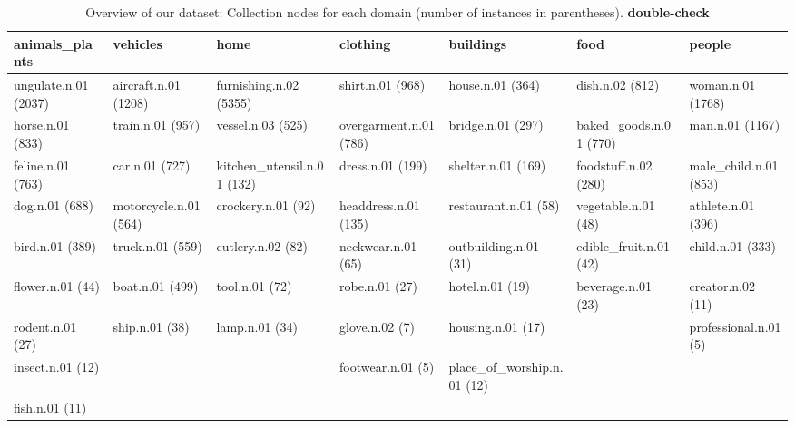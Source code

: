 \begin{table*}
\small
	\begin{tabular}{@{~}l@{~}l@{~}l@{~}l@{~}l@{~}l@{~}l}
	\toprule
	        animals\_plants &               vehicles &                        home &                clothing &                   buildings &                    food &                 people \\
	\midrule
	  ungulate.n.01 (2037) &  aircraft.n.01 (1208) &  furnishing.n.02 (5355) &  shirt.n.01 (968) &  house.n.01 (364) &  dish.n.02 (812) &  woman.n.01 (1768) \\
	 horse.n.01 (833) &  train.n.01 (957) &  vessel.n.03 (525) &  overgarment.n.01 (786) &  bridge.n.01 (297) &  baked\_goods.n.01 (770) &  man.n.01 (1167) \\
	  feline.n.01 (763) &  car.n.01 (727) &  kitchen\_utensil.n.01 (132) &  dress.n.01 (199) &  shelter.n.01 (169) &  foodstuff.n.02 (280) &  male\_child.n.01 (853) \\
	 dog.n.01 (688) &  motorcycle.n.01 (564) &  crockery.n.01 (92) &  headdress.n.01 (135) &  restaurant.n.01 (58) &  vegetable.n.01 (48) &  athlete.n.01 (396) \\
	  bird.n.01 (389) &  truck.n.01 (559) &  cutlery.n.02 (82) &  neckwear.n.01 (65) &  outbuilding.n.01 (31) &  edible\_fruit.n.01 (42) &  child.n.01 (333) \\
	  flower.n.01 (44) &  boat.n.01 (499) &  tool.n.01 (72) &  robe.n.01 (27) &  hotel.n.01 (19) &  beverage.n.01 (23) &  creator.n.02 (11) \\
	  rodent.n.01 (27) &  ship.n.01 (38) &  lamp.n.01 (34) &  glove.n.02 (7) &  housing.n.01 (17) &   &  professional.n.01 (5) \\
	 insect.n.01 (12) &   &   &  footwear.n.01 (5) &  place\_of\_worship.n.01 (12) &   &   \\
	  fish.n.01 (11) &   &   &   &   &   &   \\
	\bottomrule
\end{tabular}
	\caption{Overview of our dataset: Collection nodes for each domain (number of instances in parentheses). \textbf{double-check} \label{tab:overview_dataset2}}
\end{table*}


